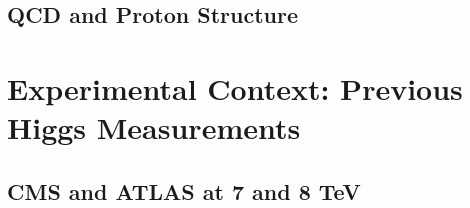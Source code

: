 \subsection{QCD and Proton Structure}

\section{Experimental Context: Previous Higgs Measurements}


\subsection{CMS and ATLAS at 7 and 8 TeV}





